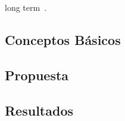 long term~\cite{montgomery2010analysis}.
\subsection{Conceptos Básicos}
\subsection{Propuesta}
\subsection{Resultados}


